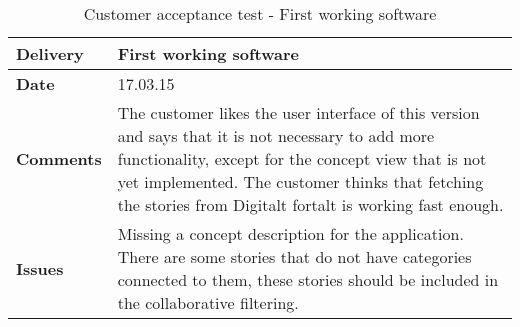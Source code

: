 \renewcommand{\arraystretch}{2}%
\begin{center}
	\begin{longtable}{ | p{4cm} | p{13cm} | }
		
		\caption[Customer acceptance test - First working software]{Customer acceptance test - First working software } \label{Tab:cattest3}\\
		\hline
		\textbf{Delivery} & First working software\\ \hline
		\textbf{Date} & 17.03.15 \\ \hline
		\textbf{Comments} & The customer likes the user interface of this version and says that it is not necessary to add more functionality, except for the concept view that is not yet implemented. The customer thinks that fetching the stories from Digitalt fortalt is working fast enough.  \\ \hline			
		\textbf{Issues} & 
		Missing a concept description for the application. There are some stories that do not have categories connected to them, these stories should be included in the collaborative filtering.
		\\ \hline		
	\end{longtable}
\end{center}

